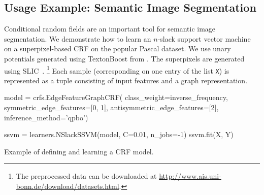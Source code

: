 \subsection{Usage Example: Semantic Image Segmentation}\label{sec:examples}

%

Conditional random fields are an important tool for semantic image
segmentation.  We demonstrate how to learn an $n$-slack support
vector machine on a superpixel-based CRF on the popular Pascal dataset. We use
unary potentials generated using TextonBoost
from \citet{krahenbuhl2012efficient}. The superpixels are generated using SLIC~\citep{achanta2012slic}.%
\footnote{The preprocessed data can be downloaded at \url{http://www.ais.uni-bonn.de/download/datasets.html}.}
Each sample (corresponding on one entry of the list \texttt{X}) is represented as a
tuple consisting of input features and a graph representation.
\begin{listing}[t]
\begin{pythoncode}
model = crfs.EdgeFeatureGraphCRF(
    class_weight=inverse_frequency, symmetric_edge_features=[0, 1],
    antisymmetric_edge_features=[2], inference_method='qpbo')

ssvm = learners.NSlackSSVM(model, C=0.01, n_jobs=-1)
ssvm.fit(X, Y)
\end{pythoncode}
\caption{Example of defining and learning a CRF model.\label{lst:stuff}}
\end{listing}

